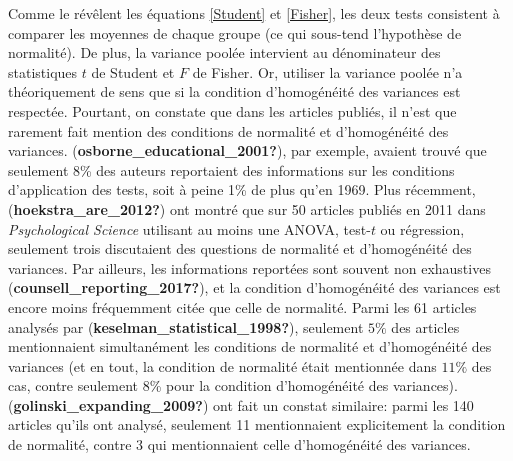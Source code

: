 \documentclass[
  english,
  man]{apa6}
\begin{document}
Comme le révêlent les équations \eqref{Student} et \eqref{Fisher}, les deux tests consistent à comparer les moyennes de chaque groupe (ce qui sous-tend l'hypothèse de normalité). De plus, la variance poolée intervient au dénominateur des statistiques \(t\) de Student et \(F\) de Fisher. Or, utiliser la variance poolée n'a théoriquement de sens que si la condition d'homogénéité des variances est respectée. Pourtant, on constate que dans les articles publiés, il n'est que rarement fait mention des conditions de normalité et d'homogénéité des variances. (\textbf{osborne\_educational\_2001?}), par exemple, avaient trouvé que seulement 8\% des auteurs reportaient des informations sur les conditions d'application des tests, soit à peine 1\% de plus qu'en 1969. Plus récemment, (\textbf{hoekstra\_are\_2012?}) ont montré que sur 50 articles publiés en 2011 dans \emph{Psychological Science} utilisant au moins une ANOVA, test-\(t\) ou régression, seulement trois discutaient des questions de normalité et d'homogénéité des variances. Par ailleurs, les informations reportées sont souvent non exhaustives (\textbf{counsell\_reporting\_2017?}), et la condition d'homogénéité des variances est encore moins fréquemment citée que celle de normalité. Parmi les 61 articles analysés par (\textbf{keselman\_statistical\_1998?}), seulement \(5\%\) des articles mentionnaient simultanément les conditions de normalité et d'homogénéité des variances (et en tout, la condition de normalité était mentionnée dans \(11\%\) des cas, contre seulement 8\% pour la condition d'homogénéité des variances). (\textbf{golinski\_expanding\_2009?}) ont fait un constat similaire: parmi les 140 articles qu'ils ont analysé, seulement 11 mentionnaient explicitement la condition de normalité, contre 3 qui mentionnaient celle d'homogénéité des variances.
\end{document}
